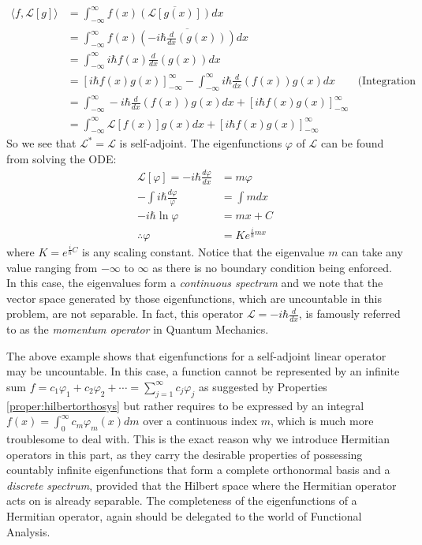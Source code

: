 \begin{solution}
\begin{align*}
\langle f,\mathcal{L}[g] \rangle &= \int_{-\infty}^\infty f(x) \overline{(\mathcal{L}[g(x)])} dx \\
&= \int_{-\infty}^\infty f(x) \overline{\left(-i \hbar\frac{d}{dx}(g(x))\right)} dx \\
&= \int_{-\infty}^\infty i\hbar f(x) \frac{d}{dx}(g(x)) dx \\
&= [i\hbar f(x)g(x)]_{-\infty}^\infty - \int_{-\infty}^\infty i\hbar \frac{d}{dx}(f(x)) g(x) dx & \text{(Integration by parts)} \\
&= \int_{-\infty}^\infty -i\hbar \frac{d}{dx}(f(x)) g(x) dx + [i\hbar f(x)g(x)]_{-\infty}^\infty \\
&= \int_{-\infty}^\infty \mathcal{L}[f(x)] g(x) dx + [i\hbar f(x)g(x)]_{-\infty}^\infty
\end{align*}
So we see that $\mathcal{L}^* = \mathcal{L}$ is self-adjoint. The eigenfunctions $\varphi$ of $\mathcal{L}$ can be found from solving the ODE:
\begin{align*}
\mathcal{L}[\varphi] = -i \hbar\frac{d\varphi}{dx} &= m\varphi \\
-\int i \hbar \frac{d\varphi}{\varphi} &= \int m dx \\
- i \hbar \ln{\varphi} &= mx + C \\
\therefore \varphi &= Ke^{\frac{i}{\hbar}mx}
\end{align*}
where $K = e^{\frac{i}{\hbar} C}$ is any scaling constant. Notice that the eigenvalue $m$ can take any value ranging from $-\infty$ to $\infty$ as there is no boundary condition being enforced. In this case, the eigenvalues form a \textit{continuous spectrum} and we note that the vector space generated by those eigenfunctions, which are uncountable in this problem, are not separable. In fact, this operator $\mathcal{L} = -i \hbar\frac{d}{dx}$, is famously referred to as the \textit{momentum operator} in Quantum Mechanics.
\end{solution}
The above example shows that eigenfunctions for a self-adjoint linear operator may be uncountable. In this case, a function cannot be represented by an infinite sum $f = c_1\varphi_1 + c_2\varphi_2 + \cdots = \sum_{j=1}^{\infty} c_j \varphi_j$ as suggested by Properties \ref{proper:hilbertorthosys} but rather requires to be expressed by an integral $f(x) = \int_0^\infty c_m\varphi_m(x) dm$ over a continuous index $m$, which is much more troublesome to deal with. This is the exact reason why we introduce Hermitian operators in this part, as they carry the desirable properties of possessing countably infinite eigenfunctions that form a complete orthonormal basis and a \textit{discrete spectrum}, provided that the Hilbert space where the Hermitian operator acts on is already separable. The completeness of the eigenfunctions of a Hermitian operator, again should be delegated to the world of Functional Analysis.
